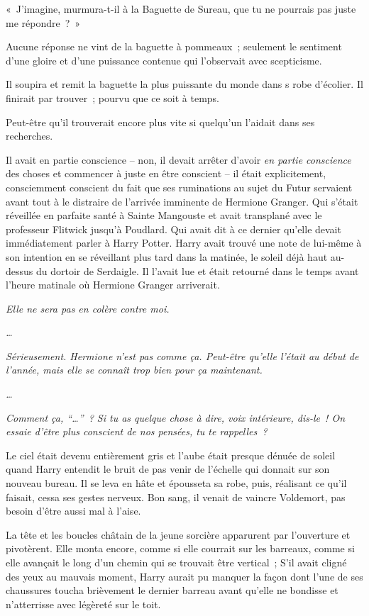 «~J'imagine, murmura-t-il à la Baguette de Sureau, que tu ne pourrais pas juste me répondre~?~»

Aucune réponse ne vint de la baguette à pommeaux~; seulement le sentiment d'une gloire et d'une puissance contenue qui l'observait avec scepticisme.

Il soupira et remit la baguette la plus puissante du monde dans s robe d'écolier. Il finirait par trouver~; pourvu que ce soit à temps.

Peut-être qu'il trouverait encore plus vite si quelqu'un l'aidait dans ses recherches.

Il avait en partie conscience -- non, il devait arrêter d'avoir \emph{en partie conscience} des choses et commencer à juste en être conscient -- il était explicitement, consciemment conscient du fait que ses ruminations au sujet du Futur servaient avant tout à le distraire de l'arrivée imminente de Hermione Granger. Qui s'était réveillée en parfaite santé à Sainte Mangouste et avait transplané avec le professeur Flitwick jusqu'à Poudlard. Qui avait dit à ce dernier qu'elle devait immédiatement parler à Harry Potter. Harry avait trouvé une note de lui-même à son intention en se réveillant plus tard dans la matinée, le soleil déjà haut au-dessus du dortoir de Serdaigle. Il l'avait lue et était retourné dans le temps avant l'heure matinale où Hermione Granger arriverait.

\emph{Elle ne sera pas en colère contre moi.}

\emph{…}

\emph{Sérieusement. Hermione n'est pas comme ça. Peut-être qu'elle l'était au début de l'année, mais elle se connaît trop bien pour ça maintenant.}

\emph{…}

\emph{Comment ça, “…”~? Si tu as quelque chose à dire, voix intérieure, dis-le~! On essaie d'être plus conscient de nos pensées, tu te rappelles~?}

\later

Le ciel était devenu entièrement gris et l'aube était presque dénuée de soleil quand Harry entendit le bruit de pas venir de l'échelle qui donnait sur son nouveau bureau. Il se leva en hâte et épousseta sa robe, puis, réalisant ce qu'il faisait, cessa ses gestes nerveux. Bon sang, il venait de vaincre Voldemort, pas besoin d'être aussi mal à l'aise.

La tête et les boucles châtain de la jeune sorcière apparurent par l'ouverture et pivotèrent. Elle monta encore, comme si elle courrait sur les barreaux, comme si elle avançait le long d'un chemin qui se trouvait être vertical~; S'il avait cligné des yeux au mauvais moment, Harry aurait pu manquer la façon dont l'une de ses chaussures toucha brièvement le dernier barreau avant qu'elle ne bondisse et n'atterrisse avec légèreté sur le toit.

